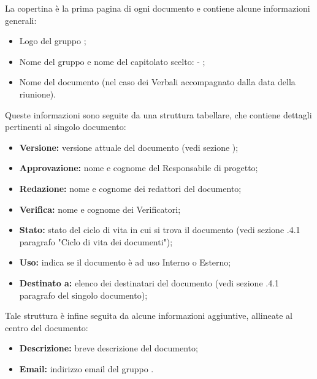         La copertina è la prima pagina di ogni documento e contiene alcune informazioni generali:
        \begin{itemize}
          \item Logo del gruppo \Gruppo{};
          \item Nome del gruppo e nome del capitolato scelto: \Gruppo{} - \NomeProgetto{};
          \item Nome del documento (nel caso dei Verbali accompagnato dalla data della riunione).
        \end{itemize}
        Queste informazioni sono seguite da una struttura tabellare, che contiene dettagli pertinenti al singolo documento:
        \begin{itemize}
          \item \textbf{Versione:} versione attuale del documento (vedi sezione );%
          \item \textbf{Approvazione:} nome e cognome del Responsabile di progetto;
          \item \textbf{Redazione:} nome e cognome dei redattori del documento;
          \item \textbf{Verifica:} nome e cognome dei Verificatori;
          \item \textbf{Stato:} stato del ciclo di vita in cui si trova il documento (vedi sezione .4.1 paragrafo "Ciclo di vita dei documenti");
          \item \textbf{Uso:} indica se il documento è ad uso Interno o Esterno;
          \item \textbf{Destinato a:} elenco dei destinatari del documento (vedi sezione .4.1 paragrafo del singolo documento);
    	\end{itemize}
    	Tale struttura è infine seguita da alcune informazioni aggiuntive, allineate al centro del documento:
    	\begin{itemize}
          \item \textbf{Descrizione:} breve descrizione del documento;
          \item \textbf{Email:} indirizzo email del gruppo \Gruppo{}.
   		\end{itemize}

